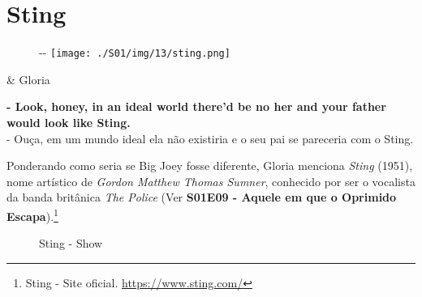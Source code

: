 \hypertarget{sting}{%
\section{Sting}\label{sting}}

\begin{figure}[!ht]
  \begin{adjustwidth}{-\oddsidemargin-1in}{-\rightmargin}
    \centering
    \texttt{[image: ./S01/img/13/sting.png]}
  \end{adjustwidth}
\end{figure}

\begin{tcolorbox}[enhanced,center upper,
    drop fuzzy shadow southeast, boxrule=0.3pt,
    lower separated=false, breakable,
    colframe=black!30!dialogoBorder,colback=white]
\begin{minipage}[c]{0.16\linewidth}
   & \centering \scriptsize{Gloria}
\end{minipage}
\hfill
\begin{minipage}[c]{0.8\linewidth}
  \textbf{- Look, honey, in an ideal world there'd be no her and your father would look like Sting.}\\
  - Ouça, em um mundo ideal ela não existiria e o seu pai se pareceria com o Sting.
\end{minipage}
\end{tcolorbox}

\saveparinfos
\noindent
\begin{minipage}[c]{0.5\textwidth}\useparinfo

Ponderando como seria se Big Joey fosse diferente, Gloria menciona
\emph{Sting} (1951), nome artístico de \emph{Gordon Matthew Thomas
Sumner}, conhecido por ser o vocalista da banda britânica \emph{The
Police} (Ver
\textbf{\textcolor{primarycolor}{S01E09 - Aquele em que o Oprimido Escapa}}).\footnote{\sloppy Sting - Site oficial. \url{https://www.sting.com/}}

\end{minipage}\hfill
\begin{minipage}[c]{0.5\textwidth}

\begin{figure}
  \centering
    \caption{Sting - Show\label{fig:sting-show}}
\end{figure}

\end{minipage}

